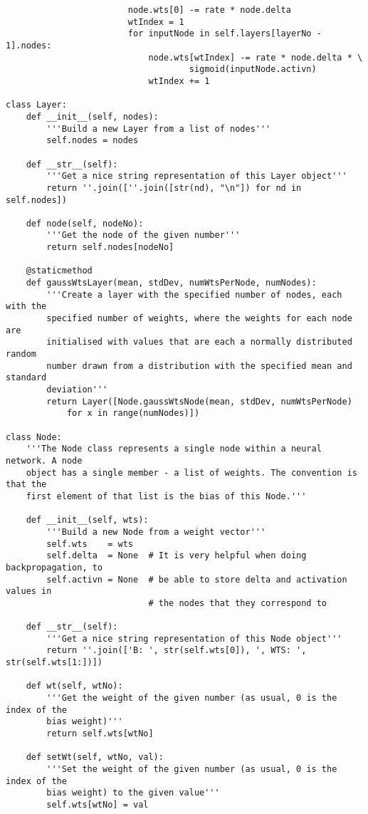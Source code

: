 \documentclass{article}
\begin{document}
\begin{verbatim}
                        node.wts[0] -= rate * node.delta
                        wtIndex = 1
                        for inputNode in self.layers[layerNo - 1].nodes:
                            node.wts[wtIndex] -= rate * node.delta * \
                                    sigmoid(inputNode.activn)
                            wtIndex += 1

class Layer:
    def __init__(self, nodes):
        '''Build a new Layer from a list of nodes'''
        self.nodes = nodes

    def __str__(self):
        '''Get a nice string representation of this Layer object'''
        return ''.join([''.join([str(nd), "\n"]) for nd in self.nodes])

    def node(self, nodeNo):
        '''Get the node of the given number'''
        return self.nodes[nodeNo]

    @staticmethod
    def gaussWtsLayer(mean, stdDev, numWtsPerNode, numNodes):
        '''Create a layer with the specified number of nodes, each with the
        specified number of weights, where the weights for each node are
        initialised with values that are each a normally distributed random
        number drawn from a distribution with the specified mean and standard
        deviation'''
        return Layer([Node.gaussWtsNode(mean, stdDev, numWtsPerNode)
            for x in range(numNodes)])

class Node:
    '''The Node class represents a single node within a neural network. A node
    object has a single member - a list of weights. The convention is that the
    first element of that list is the bias of this Node.'''

    def __init__(self, wts):
        '''Build a new Node from a weight vector'''
        self.wts    = wts
        self.delta  = None  # It is very helpful when doing backpropagation, to
        self.activn = None  # be able to store delta and activation values in
                            # the nodes that they correspond to

    def __str__(self):
        '''Get a nice string representation of this Node object'''
        return ''.join(['B: ', str(self.wts[0]), ', WTS: ', str(self.wts[1:])])

    def wt(self, wtNo):
        '''Get the weight of the given number (as usual, 0 is the index of the
        bias weight)'''
        return self.wts[wtNo]

    def setWt(self, wtNo, val):
        '''Set the weight of the given number (as usual, 0 is the index of the
        bias weight) to the given value'''
        self.wts[wtNo] = val


\end{verbatim}
\end{document}
